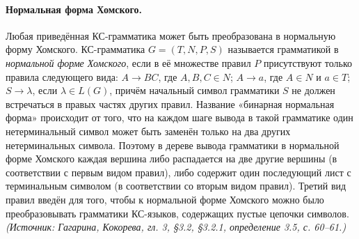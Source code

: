 \documentclass[a4paper,12pt]{article}
\begin{document}
\paragraph{Нормальная форма Хомского.}
Любая приведённая КС-грамматика может быть преобразована в нормальную форму Хомского. КС-грамматика \(G=(T,N,P,S)\) называется грамматикой в \emph{нормальной форме Хомского}, если в её множестве правил \(P\) присутствуют только правила следующего вида: \(A\to BC\), где \(A,B,C\in N\); \(A\to a\), где \(A\in N\) и \(a\in T\); \(S\to\lambda\), если \(\lambda\in L(G)\), причём начальный символ грамматики \(S\) не должен встречаться в правых частях других правил. Название «бинарная нормальная форма» происходит от того, что на каждом шаге вывода в такой грамматике один нетерминальный символ может быть заменён только на два других нетерминальных символа. Поэтому в дереве вывода грамматики в нормальной форме Хомского каждая вершина либо распадается на две другие вершины (в соответствии с первым видом правил), либо содержит один последующий лист с терминальным символом (в соответствии со вторым видом правил). Третий вид правил введён для того, чтобы к нормальной форме Хомского можно было преобразовывать грамматики КС-языков, содержащих пустые цепочки символов.
\textit{(Источник: Гагарина, Кокорева, гл. 3, §3.2, §3.2.1, определение 3.5, с. 60--61.)}
\end{document}
